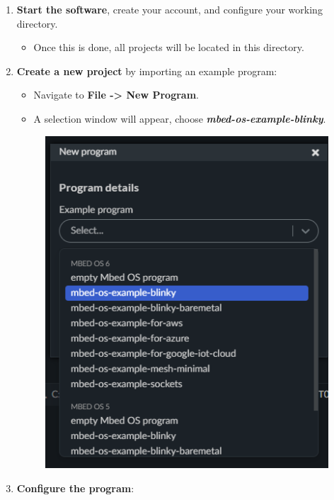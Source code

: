 \documentclass[10pt,a4paper,onecolumn]{article}
\begin{document}
\begin{enumerate}
  \item \textbf{Start the software}, create your account, and configure your working directory.
  
    \begin{itemize}
      \item Once this is done, all projects will be located in this directory.
    \end{itemize}

  \item \textbf{Create a new project} by importing an example program:
  
    \begin{itemize}
      \item Navigate to \textbf{File -> New Program}.
      \item A selection window will appear, choose \textbf{\textit{mbed-os-example-blinky}}.
    \end{itemize}
    
    \begin{figure}[H]
        \centering
        \includegraphics[width=\dimexpr\textwidth-1cm\relax,height=\dimexpr0.25\textheight-1cm\relax,keepaspectratio]{images/2.png}
    \end{figure}

  \item \textbf{Configure the program}:
  

\end{enumerate}
\end{document}
